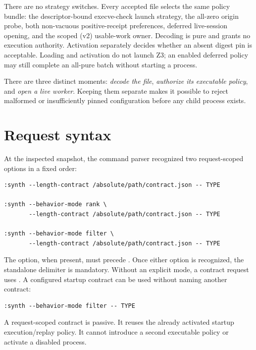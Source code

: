\documentclass[10pt,letterpaper,oneside]{report}
\newcommand{\code}[1]{\texttt{\detokenize{#1}}}
\begin{document}
There are no strategy switches. Every accepted file selects the same policy bundle: the descriptor-bound execve-check launch strategy, the all-zero origin probe, both non-vacuous positive-receipt preferences, deferred live-session opening, and the scoped (v2) usable-work owner. Decoding is pure and grants no execution authority. Activation separately decides whether an absent digest pin is acceptable. Loading and activation do not launch Z3; an enabled deferred policy may still complete an all-pure batch without starting a process.

\begin{checkpoint}
There are three distinct moments: \emph{decode the file}, \emph{authorize its executable policy}, and \emph{open a live worker}. Keeping them separate makes it possible to reject malformed or insufficiently pinned configuration before any child process exists.
\end{checkpoint}

\section{Request syntax}

At the inspected snapshot, the command parser recognized two request-scoped
options in a fixed order:

\begin{lstlisting}[language={},caption={Current Length-aware \code{:synth} forms.}]
:synth --length-contract /absolute/path/contract.json -- TYPE

:synth --behavior-mode rank \
       --length-contract /absolute/path/contract.json -- TYPE

:synth --behavior-mode filter \
       --length-contract /absolute/path/contract.json -- TYPE
\end{lstlisting}

The \code{--behavior-mode} option, when present, must precede \code{--length-contract}. Once either option is recognized, the standalone \code{--} delimiter is mandatory. Without an explicit mode, a contract request uses \code{rank}. A configured startup contract can be used without naming another contract:

\begin{lstlisting}[language={}]
:synth --behavior-mode filter -- TYPE
\end{lstlisting}

A request-scoped contract is passive. It reuses the already activated startup execution/replay policy. It cannot introduce a second executable policy or activate a disabled process.
\end{document}
